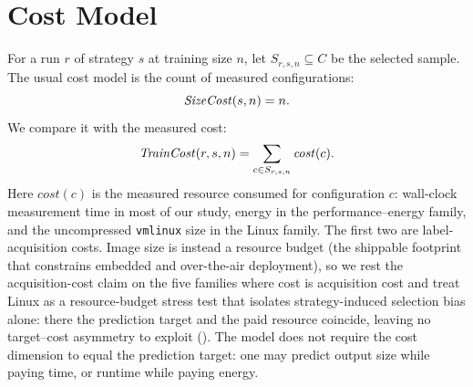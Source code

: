 \section{Cost Model}
\label{sec:cost_model}

For a run $r$ of strategy $s$ at training size $n$, let
$S_{r,s,n}\subseteq C$ be the selected sample. The usual cost model is the
count of measured configurations:
\begin{equation}
\mathit{SizeCost}(s,n)=n.
\label{eq:sizecost}
\end{equation}
We compare it with the measured cost:
\begin{equation}
\mathit{TrainCost}(r,s,n)=\sum_{c\in S_{r,s,n}}\mathit{cost}(c).
\label{eq:traincost}
\end{equation}
Here $\mathit{cost}(c)$ is the measured resource consumed for configuration $c$:
wall-clock measurement time in most of our study, energy in the
performance--energy family, and the uncompressed \texttt{vmlinux} size in the
Linux family. The first two are label-acquisition costs. Image size is instead a
resource budget (the shippable footprint that constrains embedded and
over-the-air deployment), so we rest the acquisition-cost claim on the five
families where cost is acquisition cost and treat Linux as a resource-budget
stress test that isolates strategy-induced selection bias alone: there the
prediction target and the paid resource coincide, leaving no target--cost
asymmetry to exploit (). The model does not require the
cost dimension to equal the prediction target: one may predict output size while
paying time, or runtime while paying energy.

